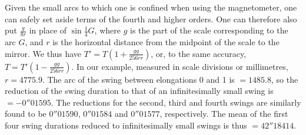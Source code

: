 Given the small arcs to which one is confined when using the magnetometer, one can safely set aside terms of the fourth and higher orders. One can therefore also put $\frac{g}{8r}$ in place of $\sin\tfrac14G$, where $g$ is the part of the scale corresponding to the arc $G$, and $r$ is the horizontal distance from the midpoint of the scale to the mirror. We thus have $T'=T(1+\frac{gg}{256rr})$, or, to the same accuracy, $T=T'(1-\frac{gg}{256rr})$. In our example, measured in scale divisions or millimetres, $r=4775.9$. The arc of the swing between elongations 0 and 1 is $=1485.8$, so the reduction of the swing duration to that of an infinitesimally small swing is $=-0''01595$. The reductions for the second, third and fourth swings are similarly found to be $0''01590$, $0''01584$ and $0''01577$, respectively. The mean of the first four swing durations reduced to infinitesimally small swings is thus $=42''18414$.

